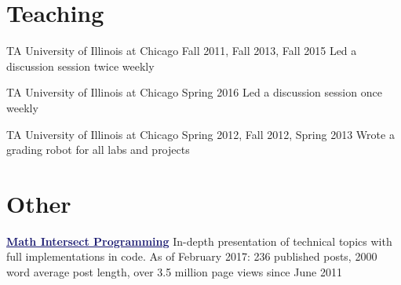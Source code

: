 \documentclass[11pt]{moderncv}
\begin{document}
   \section{Teaching}
         {TA}
      {University of Illinois at Chicago}
      {Fall 2011, Fall 2013, Fall 2015}
      {}
      {Led a discussion session twice weekly}

         {TA}
      {University of Illinois at Chicago}
      {Spring 2016}
      {}
      {Led a discussion session once weekly}

         {TA}
      {University of Illinois at Chicago}
      {Spring 2012, Fall 2012, Spring 2013}
      {}
      {Wrote a grading robot for all labs and projects}


   \section{Other}
         {\href{http://jeremykun.com}{\textcolor{MidnightBlue}{\underline{\textbf{Math Intersect Programming}}}}}
      {}
      {In-depth presentation of technical topics with full implementations in code. As of February 2017: 236 published posts, 2000 word average post length, over 3.5 million page views since June 2011}
      {}
      {}
\end{document}
